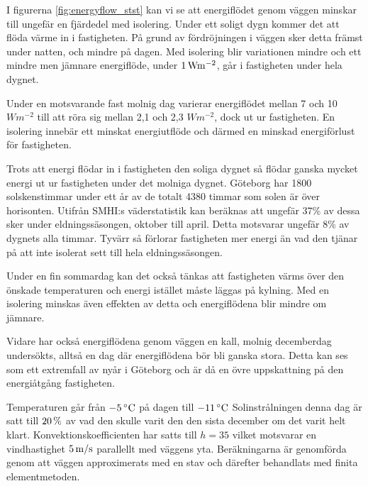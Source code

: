 I figurerna \ref{fig:energyflow_stst} kan vi se att energiflödet genom väggen minskar till 
ungefär en fjärdedel med isolering. Under ett soligt dygn kommer det att flöda värme in i
 fastigheten. På grund av fördröjningen i väggen sker detta främst under natten, 
 och mindre på dagen. Med isolering blir variationen mindre och ett mindre men jämnare 
 energiflöde, under $\unit[1]{W m^{-2}}$, går i fastigheten under hela dygnet.

Under en motsvarande fast molnig dag varierar energiflödet mellan 7 och 10 
$\unit{W m^{-2}}$ till att röra sig mellan 2,1 och 2,3 $\unit{W m^{-2}}$, dock ut ur 
fastigheten. En isolering innebär ett minskat energiutflöde och därmed en minskad 
energiförlust för fastigheten.

Trots att energi flödar in i fastigheten den soliga dygnet så flödar ganska mycket energi 
ut ur fastigheten under det molniga dygnet. Göteborg har 1800 solskenstimmar under ett
 år av de totalt 4380 timmar som solen är över horisonten. Utifrån SMHI:s väderstatistik \cite{SMHIdata}
 kan beräknas att ungefär 37\% av dessa sker under eldningssäsongen, oktober till april. 
 Detta motsvarar ungefär 8\% av dygnets alla timmar. Tyvärr så förlorar fastigheten mer 
 energi än vad den tjänar på att inte isolerat sett till hela eldningssäsongen.

Under en fin sommardag kan det också tänkas att fastigheten värms över den önskade 
temperaturen och energi istället måste läggas på kylning. Med en isolering minskas även 
effekten av detta och energiflödena blir mindre om jämnare.


Vidare har också energiflödena genom väggen en kall, molnig decemberdag undersökts, 
alltså en dag där energiflödena bör bli ganska stora. Detta kan ses som ett extremfall av
nyår i Göteborg och är då en övre uppskattning på den energiåtgång fastigheten.

 Temperaturen går från $\unit[-5]{^\circ C}$ på dagen till $\unit[-11]{^\circ C}$ 
 Solinstrålningen denna dag är satt till $\unit[20]{\%}$ av vad den skulle varit den den 
 sista december om det varit helt klart. Konvektionskoefficienten har satts till $h=35$ 
 vilket motsvarar en vindhastighet $\unit[5]{m/s}$ parallellt med väggens yta. 
 Beräkningarna är genomförda genom att väggen approximerats med en stav och 
 därefter behandlats med finita elementmetoden.


